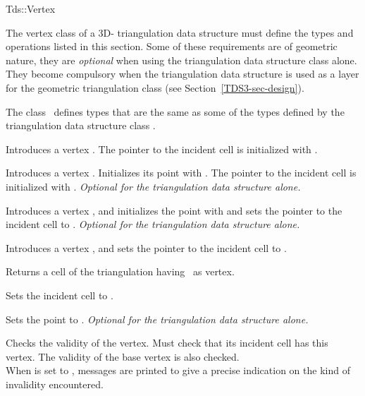 	\begin{ccClass}{Tds::Vertex}
	

The vertex class of a 3D- triangulation data structure must define
the types and operations listed in this section. Some of these
requirements are of geometric nature, they are \textit{optional}
when using the triangulation data structure class alone. They become
compulsory when the triangulation data structure is used as a layer
for the geometric triangulation class (see
Section~\ref{TDS3-sec-design}).

\ccTypes
{}
\ccThreeToTwo
{} 

The class \ccClassName\ defines types that are the same as some of the 
types defined by the triangulation data structure class .

\ccGlue
{}

\ccCreation
{}

\ccConstructor{\ccClassName();}
{Introduces a vertex \ccVar. 
The pointer to the incident cell is initialized with .}

{Introduces a vertex \ccVar. Initializes its point with .
The pointer to the incident cell is initialized with
. {\textit{Optional for the triangulation data structure alone.}}}

{Introduces a vertex \ccVar, and initializes the point with 
and sets the pointer to the incident cell to . {\textit{Optional for the
triangulation data structure alone.}}}

{Introduces a vertex \ccVar, and sets the pointer to the incident cell
to .}

\ccAccessFunctions

{Returns a cell of the triangulation having \ccVar\ as vertex.}


{Sets the incident cell to .}

{Sets the point to . {\textit{Optional for the
triangulation data structure alone.}}}

\begin{ccAdvanced}

{Checks the validity of the vertex. Must check that its incident cell
has this vertex. The validity of the base vertex is also checked.\\
When  is set to , messages are printed to give
a precise indication on the kind of invalidity encountered.}
\end{ccAdvanced}

	\end{ccClass} 

